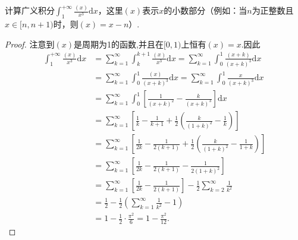 \documentclass[../../main.tex]{subfiles}
\begin{document}
\begin{example}
计算广义积分$\int_{1}^{+\infty} \frac{(x)}{x^3} \mathrm{d}x$，这里$(x)$表示$x$的小数部分（例如：当$n$为正整数且$x \in [n, n+1)$时，则$(x) = x - n$）.
\end{example}
\begin{proof}
注意到$(x)$是周期为1的函数,并且在$[0,1)$上恒有$(x)=x$.因此
\begin{align*}
\int_1^{+\infty}{\frac{\left( x \right)}{x^3}\mathrm{d}x}&=\sum_{k=1}^{\infty}{\int_k^{k+1}{\frac{\left( x \right)}{x^3}\mathrm{d}x}}=\sum_{k=1}^{\infty}{\int_0^1{\frac{\left( x+k \right)}{\left( x+k \right) ^3}\mathrm{d}x}}
\\
&=\sum_{k=1}^{\infty}{\int_0^1{\frac{\left( x \right)}{\left( x+k \right) ^3}\mathrm{d}x}}=\sum_{k=1}^{\infty}{\int_0^1{\frac{x}{\left( x+k \right) ^3}\mathrm{d}x}}
\\
&=\sum_{k=1}^{\infty}{\int_0^1{\left[ \frac{1}{\left( x+k \right) ^2}-\frac{k}{\left( x+k \right) ^3} \right] \mathrm{d}x}}
\\
&=\sum_{k=1}^{\infty}{\left[ \frac{1}{k}-\frac{1}{k+1}+\frac{1}{2}\left( \frac{k}{\left( 1+k \right) ^2}-\frac{1}{k} \right) \right]}
\\
&=\sum_{k=1}^{\infty}{\left[ \frac{1}{2k}-\frac{1}{2\left( k+1 \right)}+\frac{1}{2}\left( \frac{k}{\left( 1+k \right) ^2}-\frac{1}{1+k} \right) \right]}
\\
&=\sum_{k=1}^{\infty}{\left[ \frac{1}{2k}-\frac{1}{2\left( k+1 \right)}-\frac{1}{2\left( 1+k \right) ^2} \right]}
\\
&=\sum_{k=1}^{\infty}{\left[ \frac{1}{2k}-\frac{1}{2\left( k+1 \right)} \right]}-\frac{1}{2}\sum_{k=2}^{\infty}{\frac{1}{k ^2}}
\\
&=\frac{1}{2}-\frac{1}{2}\left( \sum_{k=1}^{\infty}{\frac{1}{k ^2}}-1 \right) 
\\
&=1-\frac{1}{2}\cdot \frac{\pi ^2}{6}=1-\frac{\pi ^2}{12}.
\end{align*}

\end{proof}
\end{document}
